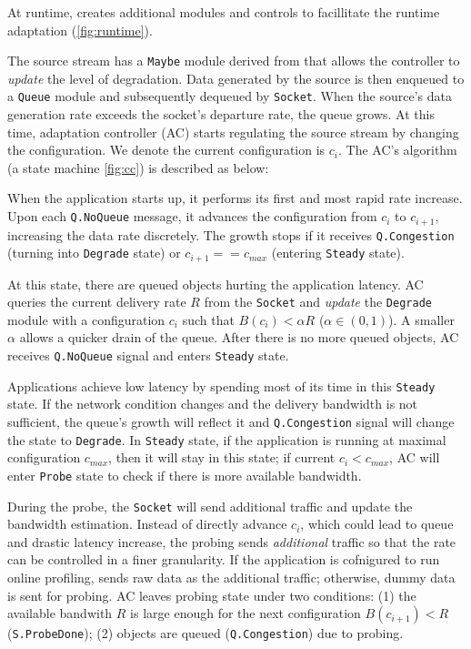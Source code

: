 At runtime, \sysname{} creates additional modules and controls to facillitate
the runtime adaptation (\autoref{fig:runtime}).

The source stream has a \texttt{Maybe} module derived from \maybe{} that allows
the controller to \textit{update} the level of degradation. Data generated by
the source is then enqueued to a \texttt{Queue} module and subsequently dequeued
by \texttt{Socket}. When the source's data generation rate exceeds the socket's
departure rate, the queue grows. At this time, adaptation controller (AC) starts
regulating the source stream by changing the configuration. We denote the
current configuration is $c_i$. The AC's algorithm (a state machine
\autoref{fig:cc}) is described as below:

 When the application starts up, it performs its
first and most rapid rate increase. Upon each \texttt{Q.NoQueue} message, it
advances the configuration from $c_i$ to $c_{i+1}$, increasing the data rate
discretely. The growth stops if it receives \texttt{Q.Congestion} (turning into
\texttt{Degrade} state) or $c_{i+1} == c_{max}$ (entering \texttt{Steady}
state).

 At this state, there are queued objects
hurting the application latency. AC queries the current delivery rate $R$ from
the \texttt{Socket} and \textit{update} the \texttt{Degrade} module with a
configuration $c_i$ such that $B(c_i) < \alpha R$ ($\alpha \in (0, 1)$). A
smaller $\alpha$ allows a quicker drain of the queue. After there is no more
queued objects, AC receives \texttt{Q.NoQueue} signal and enters \texttt{Steady}
state.

 Applications achieve low latency
by spending most of its time in this \texttt{Steady} state. If the network
condition changes and the delivery bandwidth is not sufficient, the queue's
growth will reflect it and \texttt{Q.Congestion} signal will change the state to
\texttt{Degrade}. In \texttt{Steady} state, if the application is running at
maximal configuration $c_{max}$, then it will stay in this state; if current
$c_i < c_{max}$, AC will enter \texttt{Probe} state to check if there is more
available bandwidth.

 During the probe, the
\texttt{Socket} will send additional traffic and update the bandwidth
estimation. Instead of directly advance $c_i$, which could lead to queue and
drastic latency increase, the probing sends \textit{additional} traffic so that
the rate can be controlled in a finer granularity. If the application is
cofnigured to run online profiling, \sysname{} sends raw data as the additional
traffic; otherwise, dummy data is sent for probing. AC leaves probing state
under two conditions: (1) the available bandwith $R$ is large enough for the
next configuration $B(c_{i+1}) < R$ (\texttt{S.ProbeDone}); (2) objects are
queued (\texttt{Q.Congestion}) due to probing.

